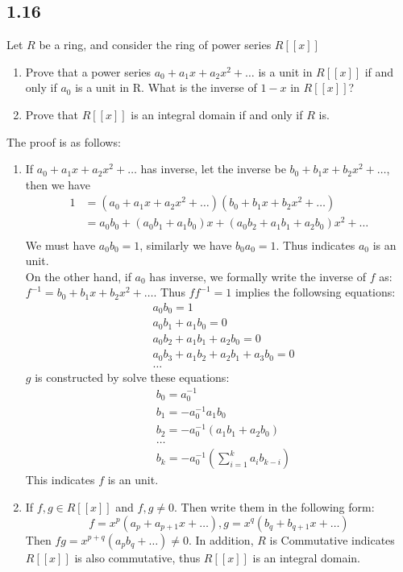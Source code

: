 \documentclass[a4paper, pdf, 12pt]{article}
\makeatletter
\renewenvironment{proof}[1][\proofname]{\par
  \pushQED{\qed}%
  \normalfont \topsep6\p@\@plus6\p@\relax
  \trivlist
  \item[%
    \hskip\labelsep
    \normalfont\bfseries %
    #1%
    \@addpunct{.}%
  ]\ignorespaces
}{%
  \popQED\endtrivlist\@endpefalse
}
\let\qed\relax %
\DeclareRobustCommand{\qed}{%
  \ifmmode \mathqed
  \else
    \leavevmode\unskip\penalty\@M\hbox{}\nobreak\hspace{.5em minus .1em}%
    \hbox{\qedsymbol}%
  \fi
}
\makeatother
\begin{document}
\subsection*{1.16}
Let $R$ be a ring, and consider the ring of power series $R[[x]]$
\begin{enumerate} [leftmargin=0cm,itemindent=.2cm,labelwidth=\itemindent,labelsep=0.2cm,align=right,label=(\roman*)]
  \item Prove that a power series $a_0+ a_1x + a_2x^2+ \ldots$ is a unit in $R[[x]]$ if and only if
  $a_0$ is a unit in R. What is the inverse of $1−x$ in $R[[x]]$?
  \item Prove that $R[[x]]$ is an integral domain if and only if $R$ is.
\end{enumerate}
\begin{proof}
  The proof is as follows:
  \begin{enumerate} [leftmargin=0cm,itemindent=.2cm,labelwidth=\itemindent,labelsep=0.2cm,align=right,label=(\roman*)]
    \item If $a_0+ a_1x + a_2x^2+ \ldots$ has inverse, let the inverse be $b_0 + b_1x + b_2x^2 + \ldots$, then we have 
    $$
    \begin{aligned}
    1 &= (a_0+ a_1x + a_2x^2+ \ldots)(b_0 + b_1x + b_2x^2 + \ldots)\\
    &= a_0b_0 + (a_0b_1 + a_1b_0)x +(a_0b_2 + a_1b_1 + a_2b_0)x^2+\ldots\\
    \end{aligned}
    $$
    We must have $a_0b_0=1$, similarly we have $b_0a_0=1$. Thus indicates $a_0$ is an unit.\\
    \noindent
    On the other hand, if $a_0$ has inverse, we formally write the inverse of $f$ as:
    $f^{-1} = b_0 + b_1x + b_2x^{2} + \ldots$. Thus $ff^{-1} = 1$ implies the followsing 
    equations:
    $$
    \begin{aligned}
      &a_0b_0 = 1\\
      &a_0b_1 + a_1b_0 = 0\\
      &a_0b_2 + a_1b_1 + a_2b_0 = 0\\
      &a_0b_3 + a_1b_2 + a_2b_1 + a_3b_0 = 0\\
      &\ldots
    \end{aligned}
    $$
    $g$ is constructed by solve these equations:
    $$
    \begin{aligned}
      &b_0 = a_0^{-1}\\
      &b_1 = -a_0^{-1}a_1b_0\\
      &b_2 = -a_0^{-1}(a_1b_1 + a_2b_0)\\
      &\ldots\\
      &b_k = -a_0^{-1}(\sum_{i=1}^{k}a_{i}b_{k-i})
    \end{aligned}
    $$
    This indicates $f$ is an unit.

  \item If $f, g\in R[[x]]$ and $f, g\neq 0$. Then write them in the following form:
  $$
  f = x^{p}(a_p + a_{p+1}x + \ldots), g = x^{q}(b_q + b_{q+1}x + \ldots)
  $$
  Then $fg = x^{p+q}(a_pb_q + \ldots)\neq 0$. In addition, $R$ is Commutative indicates $R[[x]]$ is also
  commutative, thus $R[[x]]$ is an integral domain.
  \end{enumerate}
\end{proof}
\end{document}
